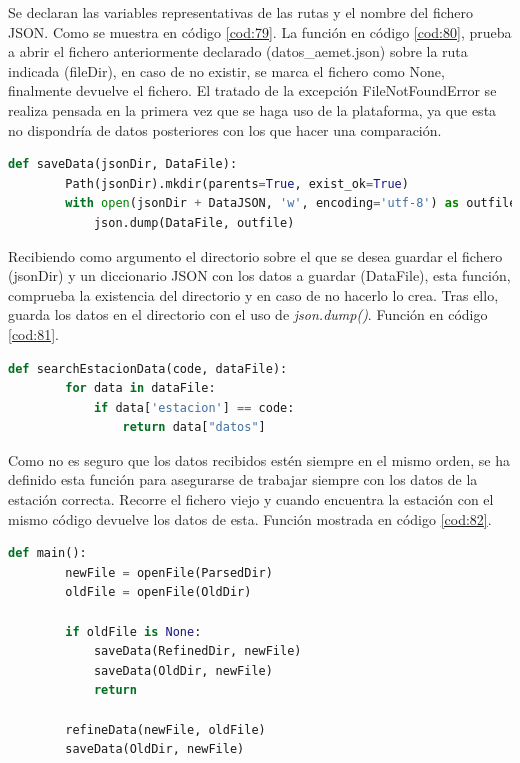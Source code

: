 Se declaran las variables representativas de las rutas y el nombre del fichero JSON. Como se muestra en código \ref{cod:79}. La función en código \ref{cod:80}, prueba a abrir el fichero anteriormente declarado (datos\_aemet.json) sobre la ruta indicada (fileDir), en caso de no existir, se marca el fichero como None, finalmente devuelve el fichero. El tratado de la excepción FileNotFoundError se realiza pensada en la primera vez que se haga uso de la plataforma, ya que esta no dispondría de datos posteriores con los que hacer una comparación.

\begin{lstlisting}[language=Python, caption={Declaración función saveFile()}, label=cod:81]
	def saveData(jsonDir, DataFile):
		Path(jsonDir).mkdir(parents=True, exist_ok=True)
		with open(jsonDir + DataJSON, 'w', encoding='utf-8') as outfile:
			json.dump(DataFile, outfile)
\end{lstlisting}

Recibiendo como argumento el directorio sobre el que se desea guardar el fichero (jsonDir) y un diccionario JSON con los datos a guardar (DataFile), esta función, comprueba la existencia del directorio y en caso de no hacerlo lo crea. Tras ello, guarda los datos en el directorio con el uso de \textit{json.dump()}. Función en código \ref{cod:81}.

\begin{lstlisting}[language=Python, caption={Declaración función searchEstacionData()}, label=cod:82]
	def searchEstacionData(code, dataFile):
		for data in dataFile:
			if data['estacion'] == code:
				return data["datos"]
\end{lstlisting}

Como no es seguro que los datos recibidos estén siempre en el mismo orden, se ha definido esta función para asegurarse de trabajar siempre con los datos de la estación correcta. Recorre el fichero viejo y cuando encuentra la estación con el mismo código devuelve los datos de esta. Función mostrada en código \ref{cod:82}.

\begin{lstlisting}[language=Python, caption={Declaración rutas JSONs}, label=cod:84]
	def main():
		newFile = openFile(ParsedDir)
		oldFile = openFile(OldDir)
		
		if oldFile is None:
			saveData(RefinedDir, newFile)
			saveData(OldDir, newFile)
			return
		
		refineData(newFile, oldFile)
		saveData(OldDir, newFile)
\end{lstlisting}


